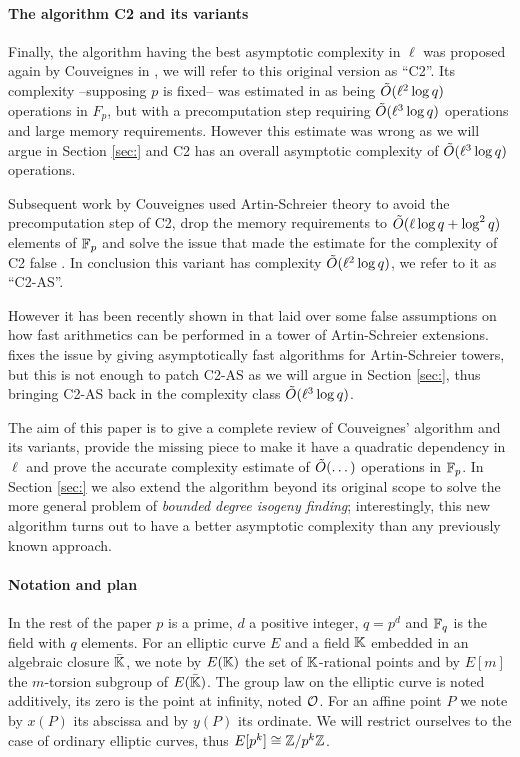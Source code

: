 \paragraph{The algorithm C2 and its variants}
Finally, the algorithm having the best asymptotic complexity in $\ell$
was proposed again by Couveignes in \cite{Cou96}, we will refer to
this original version as ``C2''. Its complexity --supposing $p$ is
fixed-- was estimated in \cite{Cou96} as being $\tilde{O}(\ell^2\log q)$
operations in $F_p$, but with a precomputation step requiring
$\tilde{O}(\ell^3\log q)$ operations and large memory
requirements. However this estimate was wrong as we will argue in
Section \ref{sec:} and C2 has an overall asymptotic complexity of
$\tilde{O}(\ell^3\log q)$ operations.

Subsequent work by Couveignes used Artin-Schreier theory to avoid the
precomputation step of C2, drop the memory requirements to
$\tilde{O}(\ell\log q + \log^2 q)$ elements of $\mathbb{F}_p$ and solve the issue
that made the estimate for the complexity of C2 false \cite{Cou00}. In
conclusion this variant has complexity $\tilde{O}(\ell^2\log q)$, we
refer to it as ``C2-AS''.

However it has been recently shown in \cite{DFS09} that \cite{Cou00}
laid over some false assumptions on how fast arithmetics can be
performed in a tower of Artin-Schreier extensions. \cite{DFS09} fixes
the issue by giving asymptotically fast algorithms for Artin-Schreier
towers, but this is not enough to patch C2-AS as we will argue in
Section \ref{sec:}, thus bringing C2-AS back in the complexity class
$\tilde{O}(\ell^3\log q)$.

The aim of this paper is to give a complete review of Couveignes'
algorithm and its variants, provide the missing piece to make it have
a quadratic dependency in $\ell$ and prove the accurate complexity
estimate of $\tilde{O}(\dots)$ operations in $\mathbb{F}_p$. In Section
\ref{sec:} we also extend the algorithm beyond its original scope to
solve the more general problem of \emph{bounded degree isogeny
finding}; interestingly, this new algorithm turns out to have a better
asymptotic complexity than any previously known approach.

\paragraph{Notation and plan}
In the rest of the paper $p$ is a prime, $d$ a positive integer,
$q=p^d$ and $\mathbb{F}_q$ is the field with $q$ elements. For an elliptic
curve $E$ and a field $\mathbb{K}$ embedded in an algebraic closure
$\bar{\mathbb{K}}$, we note by $E(\mathbb{K})$ the set of $\mathbb{K}$-rational points and by
$E[m]$ the $m$-torsion subgroup of $E(\bar{\mathbb{K}})$. The group law on
the elliptic curve is noted additively, its zero is the point at
infinity, noted $\mathcal{O}$. For an affine point $P$ we note by $x(P)$ its
abscissa and by $y(P)$ its ordinate. We will restrict ourselves to the
case of ordinary elliptic curves, thus $E[p^k]\cong\mathbb{Z}/p^k\mathbb{Z}$.

